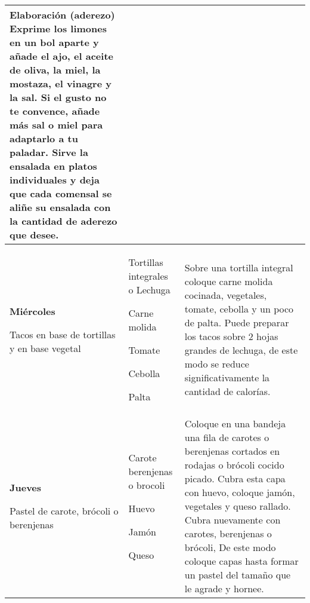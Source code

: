 \documentclass[menu.tex]{subfiles}
\begin{document}
\begin{tabular} {p{3.5cm} p{4cm} p{9cm}}
Elaboración (aderezo)
Exprime los limones en un bol aparte y añade el ajo, el aceite de oliva, la miel, la mostaza, el vinagre y la sal. Si el gusto no te convence, añade más sal o miel para adaptarlo a tu paladar. Sirve la ensalada en platos individuales y deja que cada comensal se aliñe su ensalada con la cantidad de aderezo que desee.\\
\hline

\pbox{20cm}
{
    \rule{0pt}{3ex}\begin{large}\textbf{Miércoles}\end{large}\\
    \rule{0pt}{2ex}Tacos en base de \\ tortillas y en base \\ vegetal
}&
\vspace{-0.8cm}
\begin{compactitem} 
    \begin{footnotesize}
        \item Tortillas integrales o Lechuga
        \item Carne molida
        \item Tomate
        \item Cebolla
        \item Palta
    \end{footnotesize}
\end{compactitem}&
\vspace{-0.8cm}
Sobre una tortilla integral coloque carne molida cocinada, vegetales, tomate, cebolla y un poco de palta. Puede preparar los tacos sobre 2 hojas grandes de lechuga, de este modo se reduce significativamente la cantidad de calorías.\\
\hline

\pbox{20cm}
{
    \rule{0pt}{3ex}\begin{large}\textbf{Jueves}\end{large}\\
    \rule{0pt}{2ex}Pastel de carote,\\ brócoli o berenjenas
} & 
\vspace{-0.6cm}
\begin{compactitem} 
    \begin{footnotesize}
        \item Carote berenjenas o brocoli
        \item Huevo
        \item Jamón
        \item Queso
    \end{footnotesize}
\end{compactitem}&
\vspace{-0.6cm}
Coloque en una bandeja una fila de carotes o berenjenas cortados en rodajas o brócoli cocido picado. Cubra esta capa con huevo, coloque jamón, vegetales y queso rallado. Cubra nuevamente con carotes, berenjenas o brócoli, De este modo coloque capas hasta formar un pastel del tamaño que le agrade y hornee.\\
\hline


\end{tabular}
\end{document}
